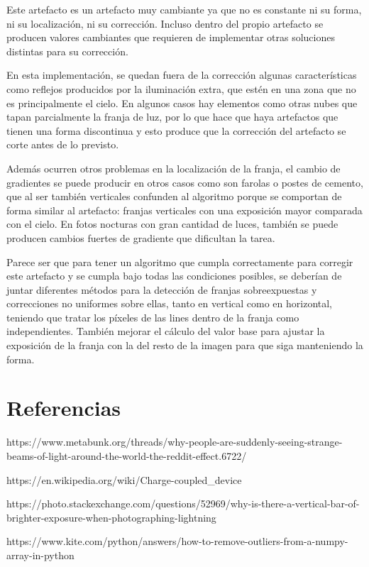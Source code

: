 \documentclass[11pt]{article}
\begin{document}
Este artefacto es un artefacto muy cambiante ya que no es constante ni
su forma, ni su localización, ni su corrección. Incluso dentro del
propio artefacto se producen valores cambiantes que requieren de
implementar otras soluciones distintas para su corrección.

En esta implementación, se quedan fuera de la corrección algunas
características como reflejos producidos por la iluminación extra, que
estén en una zona que no es principalmente el cielo. En algunos casos
hay elementos como otras nubes que tapan parcialmente la franja de luz,
por lo que hace que haya artefactos que tienen una forma discontinua y
esto produce que la corrección del artefacto se corte antes de lo
previsto.

Además ocurren otros problemas en la localización de la franja, el
cambio de gradientes se puede producir en otros casos como son farolas o
postes de cemento, que al ser también verticales confunden al algoritmo
porque se comportan de forma similar al artefacto: franjas verticales
con una exposición mayor comparada con el cielo. En fotos nocturas con
gran cantidad de luces, también se puede producen cambios fuertes de
gradiente que dificultan la tarea.

Parece ser que para tener un algoritmo que cumpla correctamente para
corregir este artefacto y se cumpla bajo todas las condiciones posibles,
se deberían de juntar diferentes métodos para la detección de franjas
sobreexpuestas y correcciones no uniformes sobre ellas, tanto en
vertical como en horizontal, teniendo que tratar los píxeles de las
lines dentro de la franja como independientes. También mejorar el
cálculo del valor base para ajustar la exposición de la franja con la
del resto de la imagen para que siga manteniendo la forma.

    \hypertarget{referencias}{%
\section{Referencias}\label{referencias}}

https://www.metabunk.org/threads/why-people-are-suddenly-seeing-strange-beams-of-light-around-the-world-the-reddit-effect.6722/

https://en.wikipedia.org/wiki/Charge-coupled\_device

https://photo.stackexchange.com/questions/52969/why-is-there-a-vertical-bar-of-brighter-exposure-when-photographing-lightning

https://www.kite.com/python/answers/how-to-remove-outliers-from-a-numpy-array-in-python


    
    
    
\end{document}

